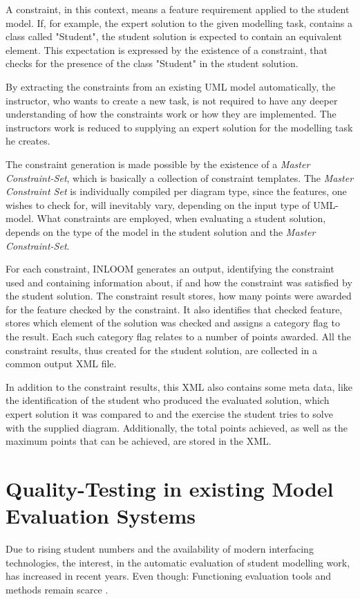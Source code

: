 A constraint, in this context, means a feature requirement applied to the student model. If, for
example, the expert solution to the given modelling task, contains a class called "Student", the 
student solution is expected to contain an equivalent element. This expectation is expressed by 
the existence of a constraint, that checks for the presence of the class "Student" in the student
solution.

By extracting the constraints from an existing UML model automatically, the instructor, who wants
to create a new task, is not required to have any deeper understanding of how the constraints 
work or how they are implemented. The instructors work is reduced to supplying an expert solution
for the modelling task he creates. 

The constraint generation is made possible by the existence of a \textit{Master Constraint-Set},
which is basically a collection of constraint templates. The \textit{Master Constraint Set} is
individually compiled per diagram type, since the features, one wishes to check for, will 
inevitably vary, depending on the input type of UML-model. 
What constraints are employed, when evaluating a student solution, depends on the type of the 
model in the student solution and the \textit{Master Constraint-Set}.

For each constraint, INLOOM generates an output, identifying the constraint used and containing 
information about, if and how the constraint was satisfied by the student solution. The 
constraint result stores, how many points were awarded for the feature checked by the constraint.
It also identifies that checked feature, stores which element of the solution was checked and 
assigns a category flag to the result. Each such category flag relates to a number of points 
awarded. All the constraint results, thus created for the student solution, are collected in a 
common output XML file. 

In addition to the constraint results, this XML also contains some meta data, like the 
identification of the student who produced the evaluated solution, which expert solution it 
was compared to and the exercise the student tries to solve with the supplied diagram.
Additionally, the total points achieved, as well as the maximum points that can be achieved,
are stored in the XML.

\section{Quality-Testing in existing Model Evaluation Systems}
Due to rising student numbers and the availability of modern interfacing technologies, the
interest, in the automatic evaluation of student modelling work, has increased in recent 
years. Even though: Functioning evaluation tools and methods remain scarce \cite{1}.

